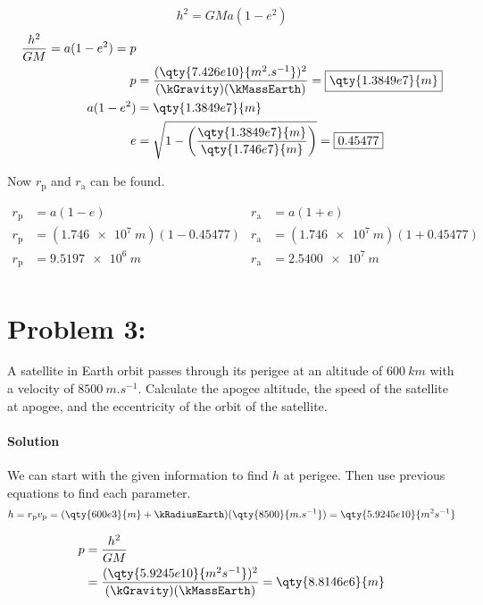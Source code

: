 \documentclass{article}
\begin{document}
{	\[
		h^2 = GMa(1-e^2)
	\]
	\begin{equation*}
		\begin{split}
			\frac{h^2}{GM} = a(1-e^2) = p& \\
			p& = \frac{(\qty{7.426e10}{m^2.s^{-1}})^2}{(\kGravity)(\kMassEarth)} = \boxed{\qty{1.3849e7}{m}} \\
			a(1-e^2)& = \qty{1.3849e7}{m} \\
			e& = \sqrt{1 - \left(\frac{\qty{1.3849e7}{m}}{\qty{1.746e7}{m}}\right)} = \boxed{0.45477}
		\end{split}
	\end{equation*}
	
	Now $r_\mathrm{p}$ and $r_\mathrm{a}$ can be found.
	
	\begin{align*}
		r_\mathrm{p} &= a(1-e) & r_\mathrm{a} &= a(1+e) \\
		r_\mathrm{p} &= (\qty{1.746e7}{m})(1-0.45477) & r_\mathrm{a} &= (\qty{1.746e7}{m})(1+0.45477) \\
		r_\mathrm{p} &= \boxed{\qty{9.5197e6}{m}} & r_\mathrm{a} &= \boxed{\qty{2.5400e7}{m}} \\
	\end{align*}
	
	\clearpage
	
	\section*{Problem 3: }
	A satellite in Earth orbit passes through its perigee at an altitude of $\qty{600}{km}$ with a velocity of $\qty{8500}{m.s^{-1}}$.  Calculate the apogee altitude, the speed of the satellite at apogee, and the eccentricity of the orbit of the satellite.
	\paragraph{Solution} We can start with the given information to find $h$ at perigee. Then use previous equations to find each parameter. \\
	
	\begin{equation*}
		\begin{split}
			h = r_\mathrm{p} v_\mathrm{p} = (\qty{600e3}{m} + \kRadiusEarth)(\qty{8500}{m.s^{-1}}) = \qty{5.9245e10}{m^2 s^{-1}}
		\end{split}
	\end{equation*}
	
	\begin{equation*}
		\begin{split}
			p &= \frac{h^2}{GM} \\
			&= \frac{(\qty{5.9245e10}{m^2 s^{-1}})^2}{(\kGravity)(\kMassEarth)} = \qty{8.8146e6}{m}
		\end{split}
	\end{equation*}
	
}
\end{document}
